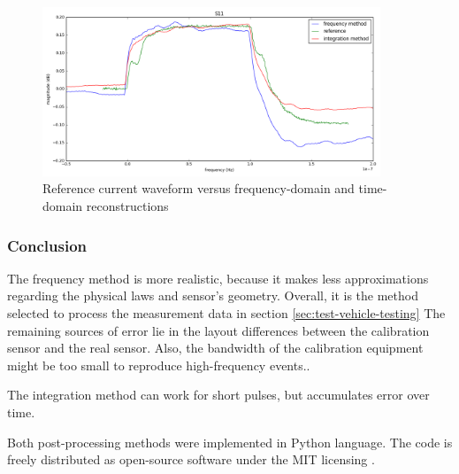 \begin{figure}[!htbp]
  \centering
  \includegraphics[width=0.9\textwidth]{src/3/figures/final_comparison_reconstructions.png}
  \caption{Reference current waveform versus frequency-domain and time-domain reconstructions}
  \label{fig:freq-domain-reconstructed}
\end{figure}

\subsubsection{Conclusion}

The frequency method is more realistic, because it makes less approximations regarding the physical laws and sensor's geometry.
Overall, it is the method selected to process the measurement data in section \ref{sec:test-vehicle-testing}
The remaining sources of error lie in the layout differences between the calibration sensor and the real sensor.
Also, the bandwidth of the calibration equipment might be too small to reproduce high-frequency events..

The integration method can work for short pulses, but accumulates error over time.

Both post-processing methods were implemented in Python language.
The code is freely distributed \cite{nfs-repository} as open-source software under the MIT licensing \cite{mit-licensing}.
